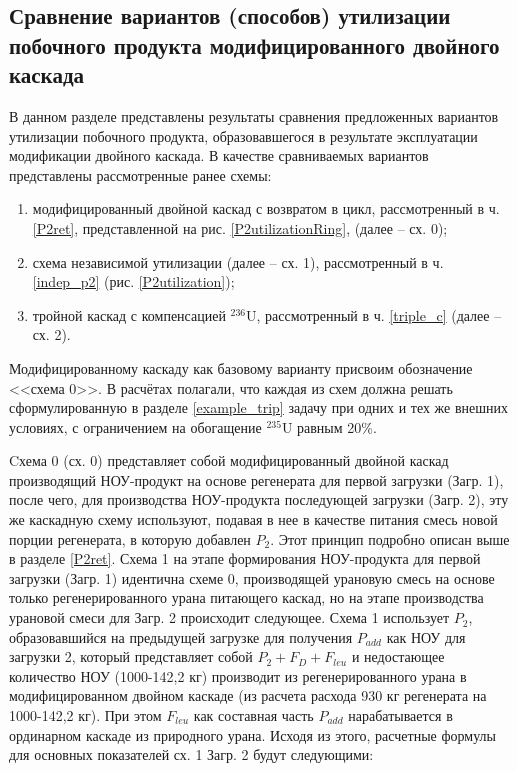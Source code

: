 \subsection{Сравнение вариантов (способов) утилизации побочного продукта модифицированного двойного каскада}

В данном разделе представлены результаты сравнения предложенных вариантов утилизации побочного продукта, образовавшегося в результате эксплуатации модификации двойного каскада. В качестве сравниваемых вариантов представлены  рассмотренные ранее схемы: 

\begin{enumerate}
    \item модифицированный двойной каскад с возвратом в цикл, рассмотренный в ч. \ref{P2ret}, представленной на рис. \ref{P2utilizationRing}, (далее -- сх. 0);
    \item схема независимой утилизации (далее -- сх. 1), рассмотренный в ч. \ref{indep_p2} (рис. \ref{P2utilization});
    \item тройной каскад с компенсацией $^{236}$U, рассмотренный в ч. \ref{triple_c} (далее -- сх. 2).
\end{enumerate}

Модифицированному каскаду как базовому варианту присвоим обозначение <<схема 0>>. В расчётах полагали, что каждая из схем должна решать сформулированную в разделе \ref{example_trip} задачу при одних и тех же внешних условиях, с ограничением на обогащение $^{235}$U равным 20\%.

Cхема 0 (сх. 0) представляет собой модифицированный двойной каскад производящий НОУ-продукт на основе регенерата для первой загрузки (Загр. 1), после чего, для производства НОУ-продукта последующей загрузки (Загр. 2), эту же каскадную схему используют, подавая в нее в качестве питания смесь новой порции регенерата, в которую добавлен $P_2$. Этот принцип подробно описан выше в разделе \ref{P2ret}. Схема 1 на этапе формирования НОУ-продукта для первой загрузки (Загр. 1) идентична схеме 0, производящей урановую смесь на основе только регенерированного урана питающего каскад, но на этапе производства урановой смеси для Загр. 2 происходит следующее. Схема 1 использует $P_2$, образовавшийся на предыдущей загрузке для получения $P_{add}$ как НОУ для загрузки 2, который представляет собой $P_2+F_D+F_{leu}$ и недостающее количество НОУ (1000-142,2 кг) производит из регенерированного урана в модифицированном двойном каскаде (из расчета расхода 930 кг регенерата на 1000-142,2 кг). При этом $F_{leu}$ как составная часть $P_{add}$ нарабатывается в ординарном каскаде из природного урана. Исходя из этого, расчетные формулы для основных показателей сх. 1 Загр. 2 будут следующими:

